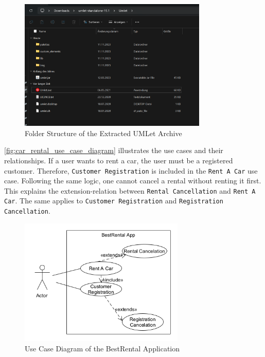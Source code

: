 \begin{figure}
    \centering
    \includegraphics[width=0.8\textwidth]{figures/goLang/carRental/carRental_umletInstallation.png}
    \caption{Folder Structure of the Extracted UMLet Archive}
    \label{fig:umlet_folder_structure}
\end{figure}

\autoref{fig:car_rental_use_case_diagram} illustrates the use cases and their relationships.
If a user wants to rent a car, the user must be a registered customer.
Therefore, \texttt{Customer Registration} is included in the \texttt{Rent A Car} use case.
Following the same logic, one cannot cancel a rental without renting it first.
This explains the extension-relation between \texttt{Rental Cancellation} and \texttt{Rent A Car}.
The same applies to \texttt{Customer Registration} and \texttt{Registration Cancellation}.

\begin{figure}
    \centering
    \includegraphics[width=0.7\textwidth]{figures/goLang/carRental/carRental_umlDiagram.png}
    \caption{Use Case Diagram of the BestRental Application}
    \label{fig:car_rental_use_case_diagram}
\end{figure}

